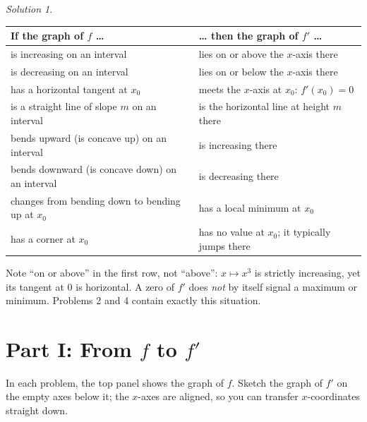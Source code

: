 \documentclass[
  letterpaper,
  DIV=11,
  numbers=noendperiod]{scrreprt}
\newcounter{none} %
\theoremstyle{plain}
\theoremstyle{plain}
\theoremstyle{definition}
\theoremstyle{definition}
\theoremstyle{definition}
\theoremstyle{plain}
\theoremstyle{plain}
\theoremstyle{remark}
\newtheorem*{solution}{Solution}
\begin{document}
\begin{solution}
\leavevmode

{\def\LTcaptype{none} %
\begin{longtable}[]{@{}
  >{\raggedright\arraybackslash}p{}
  >{\raggedright\arraybackslash}p{}@{}}
\toprule\noalign{}
\begin{minipage}[b]{\linewidth}\raggedright
If the graph of \(f\) \ldots{}
\end{minipage} & \begin{minipage}[b]{\linewidth}\raggedright
\ldots{} then the graph of \(f'\) \ldots{}
\end{minipage} \\
\midrule\noalign{}
\endhead
\bottomrule\noalign{}
\endlastfoot
is increasing on an interval & lies on or above the \(x\)-axis there \\
is decreasing on an interval & lies on or below the \(x\)-axis there \\
has a horizontal tangent at \(x_0\) & meets the \(x\)-axis at \(x_0\):
\(f'(x_0)=0\) \\
is a straight line of slope \(m\) on an interval & is the horizontal
line at height \(m\) there \\
bends upward (is concave up) on an interval & is increasing there \\
bends downward (is concave down) on an interval & is decreasing there \\
changes from bending down to bending up at \(x_0\) & has a local minimum
at \(x_0\) \\
has a corner at \(x_0\) & has no value at \(x_0\); it typically jumps
there \\
\end{longtable}
}

Note ``on or above'' in the first row, not ``above'': \(x \mapsto x^3\)
is strictly increasing, yet its tangent at \(0\) is horizontal. A zero
of \(f'\) does \emph{not} by itself signal a maximum or minimum.
Problems 2 and 4 contain exactly this situation.
\end{solution}

\section{\texorpdfstring{Part I: From \(f\) to
\(f'\)}{Part I: From f to f\textquotesingle{}}}\label{part-i-from-f-to-f}

In each problem, the top panel shows the graph of \(f\). Sketch the
graph of \(f'\) on the empty axes below it; the \(x\)-axes are aligned,
so you can transfer \(x\)-coordinates straight down.
\end{document}
